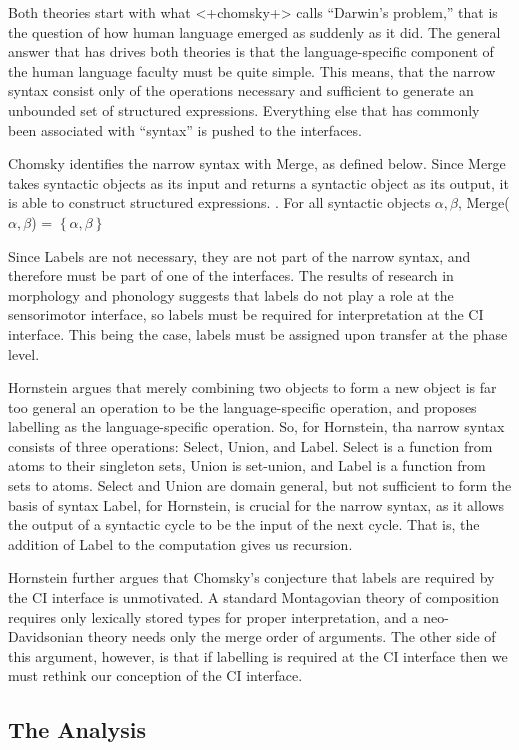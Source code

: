 \documentclass[letterpaper]{article}
\begin{document}
Both theories start with what <+chomsky+> calls ``Darwin's problem,'' that is the question of how human language emerged as suddenly as it did.
The general answer that has drives both theories is that the language-specific component of the human language faculty must be quite simple.
This means, that the narrow syntax consist only of the operations necessary and sufficient to generate an unbounded set of structured expressions.
Everything else that has commonly been associated with ``syntax'' is pushed to the interfaces.

Chomsky identifies the narrow syntax with Merge, as defined below.
Since Merge takes syntactic objects as its input and returns a syntactic object as its output, it is able to construct structured expressions.
\ex. For all syntactic objects $\alpha,\beta$, Merge($\alpha, \beta$) = $\left\{ \alpha, \beta \right\}$

Since Labels are not necessary, they are not part of the narrow syntax, and therefore must be part of one of the interfaces.
The results of research in morphology and phonology suggests that labels do not play a role at the sensorimotor interface, so labels must be required for interpretation at the CI interface.
This being the case, labels must be assigned upon transfer at the phase level.

Hornstein argues that merely combining two objects to form a new object is far too general an operation to be the language-specific operation, and proposes labelling as the language-specific operation.
So, for Hornstein, tha narrow syntax consists of three operations: Select, Union, and Label.
Select is a function from atoms to their singleton sets, Union is set-union, and Label is a function from sets to atoms.
Select and Union are domain general, but not sufficient to form the basis of syntax
Label, for Hornstein, is crucial for the narrow syntax, as it allows the output of a syntactic cycle to be the input of the next cycle.
That is, the addition of Label to the computation gives us recursion.

Hornstein further argues that Chomsky's conjecture that labels are required by the CI interface is unmotivated.
A standard Montagovian theory of composition requires only lexically stored types for proper interpretation, and a neo-Davidsonian theory needs only the merge order of arguments.
The other side of this argument, however, is that if labelling is required at the CI interface then we must rethink our conception of the CI interface.

\subsection{The Analysis}
\end{document}
